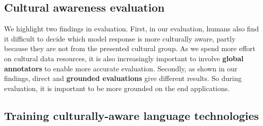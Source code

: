 \documentclass{article} %
\newcommand{\ryan}[1]{\textcolor{magenta}{[#1 --Ryan]}}
\begin{document}

\subsection{Cultural awareness evaluation}
We highlight two findings in evaluation. First, in our evaluation, humans also find it difficult to decide which model response is more culturally aware, partly because they are not from the presented cultural group. As we spend more effort on cultural data resources, it is also increasingly important to involve \textbf{global annotators} to enable more accurate evaluation. Secondly, as shown in our findings, direct and \textbf{grounded evaluations} give different results. %
So during evaluation, it is important to be more grounded on the end applications.

\subsection{Training culturally-aware language technologies}
\end{document}
